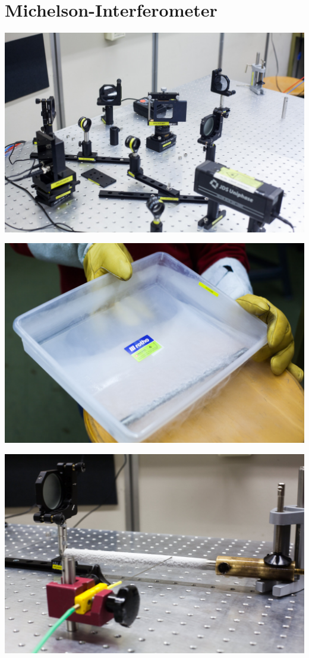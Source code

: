\documentclass[11pt]{beamer}
\begin{document}
\section{Michelson-Interferometer}
\begin{frame}
	\includegraphics[width=\textwidth]{images/2/interferrometer-4}
\end{frame}

\begin{frame}
	\includegraphics[width=\textwidth]{images/2/interferrometer-1}
\end{frame}

\begin{frame}
	\includegraphics[width=\textwidth]{images/2/interferrometer-2}
\end{frame}
\end{document}

